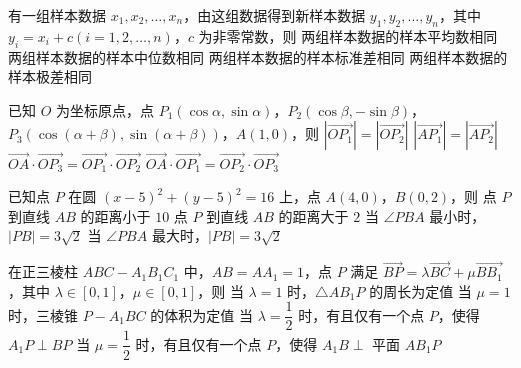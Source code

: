 \documentclass[a4paper,11pt]{report}
\begin{document}
\begin{examquestions}[start=9]

\item 有一组样本数据 $x_1,x_2,\ldots,x_n$，由这组数据得到新样本数据 $y_1,y_2,\ldots,y_n$，其中 $y_i=x_i+c(i=1,2,\ldots,n)$，$c$ 为非零常数，则
\onechoices
{两组样本数据的样本平均数相同}
{两组样本数据的样本中位数相同}
{两组样本数据的样本标准差相同}
{两组样本数据的样本极差相同}

\item 已知 $O$ 为坐标原点，点 $P_1(\cos\alpha,\sin\alpha)$，$P_2(\cos\beta,-\sin\beta)$，$P_3(\cos(\alpha+\beta),\sin(\alpha+\beta))$，$A(1,0)$，则
\twochoices
{$|\vec{OP_1}|=|\vec{OP_2}|$}
{$|\vec{AP_1}|=|\vec{AP_2}|$}
{$\vec{OA}\cdot\vec{OP_3}=\vec{OP_1}\cdot\vec{OP_2}$}
{$\vec{OA}\cdot\vec{OP_1}=\vec{OP_2}\cdot\vec{OP_3}$}

\item 已知点 $P$ 在圆 $(x-5)^2+(y-5)^2=16$ 上，点 $A(4,0)$，$B(0,2)$，则
\twochoices
{点 $P$ 到直线 $AB$ 的距离小于 $10$}
{点 $P$ 到直线 $AB$ 的距离大于 $2$}
{当 $\angle PBA$ 最小时，$|PB|=3\sqrt2$}
{当 $\angle PBA$ 最大时，$|PB|=3\sqrt2$}

\item 在正三棱柱 $ABC-A_1B_1C_1$ 中，$AB=AA_1=1$，点 $P$ 满足 $\vec{BP}=\lambda\vec{BC}+\mu\vec{BB_1}$，其中 $\lambda\in[0,1]$，$\mu\in[0,1]$，则
\onechoices
{当 $\lambda=1$ 时，$\triangle AB_1P$ 的周长为定值}
{当 $\mu=1$ 时，三棱锥 $P-A_1BC$ 的体积为定值}
{当 $\lambda=\dfrac12$ 时，有且仅有一个点 $P$，使得 $A_1P\perp BP$}
{当 $\mu=\dfrac12$ 时，有且仅有一个点 $P$，使得 $A_1B\perp$ 平面 $AB_1P$}

\end{examquestions}
\end{document}
